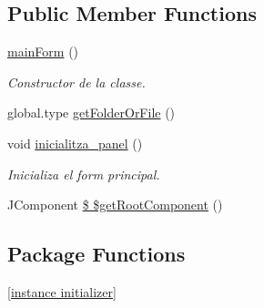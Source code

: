 \subsection*{Public Member Functions}
\begin{DoxyCompactItemize}
\item 
\hyperlink{classpresentacion_1_1form_1_1mainForm_ac1236f4bc250bf2f5a4a01a072e77555}{main\+Form} ()
\begin{DoxyCompactList}\small\item\em Constructor de la classe. \end{DoxyCompactList}\item 
global.\+type \hyperlink{classpresentacion_1_1form_1_1mainForm_af6d62b4914fbc44469a3c173e0472c43}{get\+Folder\+Or\+File} ()
\item 
void \hyperlink{classpresentacion_1_1form_1_1mainForm_aae4c847b58c5d50945fa1dd27d534319}{inicialitza\+\_\+panel} ()
\begin{DoxyCompactList}\small\item\em Inicializa el form principal. \end{DoxyCompactList}\item 
J\+Component \hyperlink{classpresentacion_1_1form_1_1mainForm_a7a42bc26bc20cc928c82bac33c43764c}{\$ \$get\+Root\+Component} ()
\end{DoxyCompactItemize}
\subsection*{Package Functions}
\begin{DoxyCompactItemize}
\item 
\hyperlink{classpresentacion_1_1form_1_1mainForm_a5db496bbae052ad3d04d03e194db82e4}{\mbox{[}instance initializer\mbox{]}}
\end{DoxyCompactItemize}
